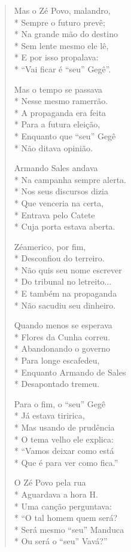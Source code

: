 \begin{verse}
Mas o Zé Povo, malandro,\\*
Sempre o futuro prevê;\\*
Na grande mão do destino\\*
Sem lente mesmo ele lê,\\*
E por isso propalava:\\*
“Vai ficar é “seu” Gegê”.

Mas o tempo se passava\\*
Nesse mesmo ramerrão.\\*
A propaganda era feita\\*
Para a futura eleição,\\*
Enquanto que “seu” Gegê\\*
Não ditava opinião.

Armando Sales andava\\*
Na campanha sempre alerta.\\*
Nos seus discursos dizia\\*
Que venceria na certa,\\*
Entrava pelo Catete\\*
Cuja porta estava aberta.

Zéamerico, por fim,\\*
Desconfiou do terreiro.\\*
Não quis seu nome escrever\\*
Do tribunal no letreito...\\*
E também na propaganda\\*
Não sacudiu seu dinheiro.

Quando menos se esperava\\*
Flores da Cunha correu.\\*
Abandonando o governo\\*
Para longe escafedeu,\\*
Enquanto Armando de Sales\\*
Desapontado tremeu.

Para o fim, o “seu” Gegê\\*
Já estava tiririca,\\*
Mas usando de prudência\\*
O tema velho ele explica:\\*
“Vamos deixar como está\\*
Que é para ver como fica.”

O Zé Povo pela rua\\*
Aguardava a hora H.\\*
Uma canção perguntava:\\*
“O tal homem quem será?\\*
Será mesmo “seu” Manduca\\*
Ou será o “seu” Vavá?”


\end{verse}
